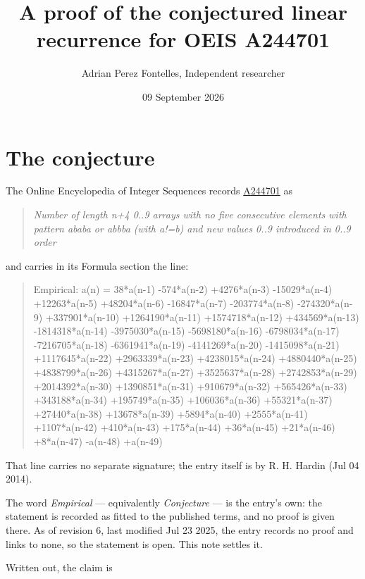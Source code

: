 \documentclass[11pt]{article}
\title{A proof of the conjectured linear recurrence for OEIS A244701}
\author{Adrian Perez Fontelles, Independent researcher}
\date{09 September 2026}
\theoremstyle{definition}
\begin{document}
\maketitle
\section{The conjecture}

The Online Encyclopedia of Integer Sequences records \href{https://oeis.org/A244701}{A244701} as

\begin{quote}\itshape Number of length n+4 0..9 arrays with no five consecutive elements with pattern ababa or abbba (with a!=b) and new values 0..9 introduced in 0..9 order\end{quote}

and carries in its Formula section the line:

\begin{quote}\ttfamily Empirical: a(n) = 38*a(n-1) -574*a(n-2) +4276*a(n-3) -15029*a(n-4) +12263*a(n-5) +48204*a(n-6) -16847*a(n-7) -203774*a(n-8) -274320*a(n-9) +337901*a(n-10) +1264190*a(n-11) +1574718*a(n-12) +434569*a(n-13) -1814318*a(n-14) -3975030*a(n-15) -5698180*a(n-16) -6798034*a(n-17) -7216705*a(n-18) -6361941*a(n-19) -4141269*a(n-20) -1415098*a(n-21) +1117645*a(n-22) +2963339*a(n-23) +4238015*a(n-24) +4880440*a(n-25) +4838799*a(n-26) +4315267*a(n-27) +3525637*a(n-28) +2742853*a(n-29) +2014392*a(n-30) +1390851*a(n-31) +910679*a(n-32) +565426*a(n-33) +343188*a(n-34) +195749*a(n-35) +106036*a(n-36) +55321*a(n-37) +27440*a(n-38) +13678*a(n-39) +5894*a(n-40) +2555*a(n-41) +1107*a(n-42) +410*a(n-43) +175*a(n-44) +36*a(n-45) +21*a(n-46) +8*a(n-47) -a(n-48) +a(n-49)\end{quote}

That line carries no separate signature; the entry itself is by R. H. Hardin (Jul 04 2014).

The word {\itshape Empirical} --- equivalently {\itshape Conjecture} --- is the entry's own: the statement is recorded as fitted to the published terms, and no proof is given there. As of revision 6, last modified Jul 23 2025, the entry records no proof and links to none, so the statement is open. This note settles it.

Written out, the claim is
\end{document}
